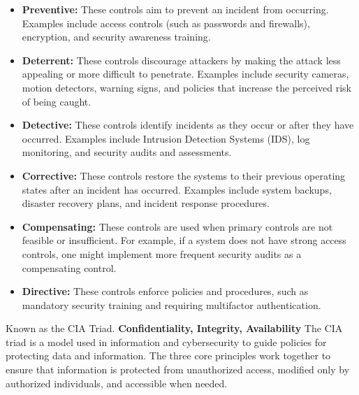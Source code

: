 \begin{itemize}
    \item \textbf{Preventive:} These controls aim to prevent an incident from occurring. Examples include access controls (such as passwords and firewalls), encryption, and security awareness training.
    \item \textbf{Deterrent:} These controls discourage attackers by making the attack less appealing or more difficult to penetrate. Examples include security cameras, motion detectors, warning signs, and policies that increase the perceived risk of being caught.
    \item \textbf{Detective:} These controls identify incidents as they occur or after they have occurred. Examples include Intrusion Detection Systems (IDS), log monitoring, and security audits and assessments.
    \item \textbf{Corrective:} These controls restore the systems to their previous operating states after an incident has occurred. Examples include system backups, disaster recovery plans, and incident response procedures.
    \item \textbf{Compensating:} These controls are used when primary controls are not feasible or insufficient. For example, if a system does not have strong access controls, one might implement more frequent security audits as a compensating control.
    \item \textbf{Directive:} These controls enforce policies and procedures, such as mandatory security training and requiring multifactor authentication.
\end{itemize}

 Known as the CIA Triad. \textbf{Confidentiality, Integrity, Availability} The CIA triad is a model used in information and cybersecurity to guide policies for protecting data and information. The three core principles work together to ensure that information is protected from unauthorized access, modified only by authorized individuals, and accessible when needed.

